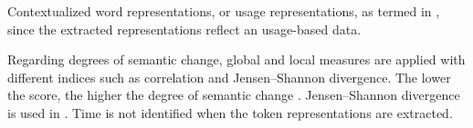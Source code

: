 Contextualized word representations, or usage representations, as termed in \parencite{giulianelli2019lexical}, since the extracted representations reflect an usage-based data.

Regarding degrees of semantic change, global and local measures are applied with different indices such as correlation and Jensen–Shannon divergence. The lower the score, the higher the degree of semantic change \parencite{hamilton2016law}. Jensen–Shannon divergence is used in \textcite{giulianelli2019lexical}. Time is not identified when the token representations are extracted.

